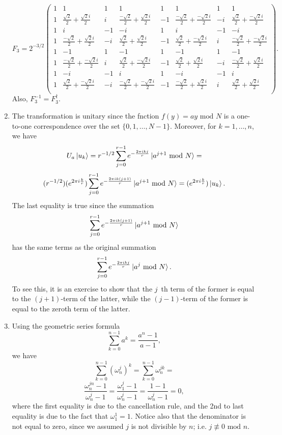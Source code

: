 \documentclass [12pt]{article}
\theoremstyle{definition}
\begin{document}
\begin{enumerate}
\[F_3 = 2^{-3/2}
\left(\begin{array}{cccccccc}
1 & 1 & 1 & 1 & 1 & 1 & 1 & 1\\
1 & \frac{\sqrt{2}}{2}+ \frac{\sqrt{2}i}{2} & i & \frac{-\sqrt{2}}{2}+ \frac{\sqrt{2}i}{2} & -1 & \frac{-\sqrt{2}}{2}+ \frac{-\sqrt{2}i}{2} & -i & \frac{\sqrt{2}}{2}+ \frac{-\sqrt{2}i}{2}\\
1 & i & -1 & -i & 1 & i & -1 & -i\\
1 & \frac{-\sqrt{2}}{2}+ \frac{\sqrt{2}i}{2} & -i & \frac{\sqrt{2}}{2}+ \frac{\sqrt{2}i}{2} & -1 & \frac{\sqrt{2}}{2}+ \frac{-\sqrt{2}i}{2} & i & \frac{-\sqrt{2}}{2}+ \frac{-\sqrt{2}i}{2}\\
1 & -1 & 1 & -1 & 1 & -1 & 1 & -1\\
1 & \frac{-\sqrt{2}}{2}+ \frac{-\sqrt{2}i}{2} & i & \frac{\sqrt{2}}{2}+ \frac{-\sqrt{2}i}{2} & -1 & \frac{\sqrt{2}}{2}+ \frac{\sqrt{2}i}{2} & -i & \frac{-\sqrt{2}}{2}+ \frac{\sqrt{2}i}{2}\\
1 & -i & -1 & i & 1 & -i & -1 & i\\
1 & \frac{\sqrt{2}}{2}+ \frac{-\sqrt{2}i}{2} & -i & \frac{-\sqrt{2}}{2}+ \frac{-\sqrt{2}i}{2} & -1 & \frac{-\sqrt{2}}{2}+ \frac{\sqrt{2}i}{2} & i & \frac{\sqrt{2}}{2}+ \frac{\sqrt{2}i}{2}\\
\end{array}\right).
\]
Also, $F_3^{-1}=F_3^{\dagger}$.


\item The transformation is unitary since the fnction $f(y) = ay\mbox{ mod } N$ is a one-to-one correspondence over the set $\{0,1,\ldots,N-1\}$.
Moreover, for $k=1,\ldots,n$, we have
\[U_a\ket{u_k} = r^{-1/2}\sum_{j=0}^{r-1}e^{-\frac{2\pi ikj}{r}}\ket{a^{j+1}\mbox{ mod } N} = \]
\[(r^{-1/2})(e^{2\pi i\frac{k}{r}})\sum_{j=0}^{r-1}e^{-\frac{2\pi ik(j+1)}{r}}\ket{a^{j+1}\mbox{ mod } N} = (e^{2\pi i\frac{k}{r}})\ket{u_k}.\]
The last equality is true since the summation
\[ \sum_{j=0}^{r-1}e^{-\frac{2\pi ik(j+1)}{r}}\ket{a^{j+1}\mbox{ mod } N}\]
has the same terms as the original summation 
\[\sum_{j=0}^{r-1}e^{-\frac{2\pi ikj}{r}}\ket{a^j\mbox{ mod } N}.\]
To see this, it is an exercise to show that the $j$~th term of the former is equal to the $(j+1)$-term of the latter, while the $(j-1)$-term of the former is equal
to the zeroth term of the latter.


\item  Using the geometric series formula
\[\overset{n-1}{\underset{k=0}{\sum}}a^{k}=\frac{a^{n}-1}{a-1},\]
we have
\[\overset{n-1}{\underset{k=0}{\sum}}(\omega_{n}^{j})^{k}=\overset{n-1}{\underset{k=0}{\sum}}\omega_{n}^{jk}=\]
\[\frac{\omega_{n}^{jn}-1}{\omega_{n}^{j}-1}=\frac{\omega_{1}^{j}-1}{\omega_{n}^{j}-1}=\frac{1-1}{\omega_{n}^{j}-1}=0,\]
where the first equality is due to the cancellation rule, and the 2nd to last equality is due to the fact that $\omega_{1}^{1}=1$. Notice also
that the denominator is not equal to zero, since we assumed $j$ is not divisible by $n$; i.e. $j\not\equiv 0\mbox{ mod }n$.




\end{enumerate}
\end{document}
